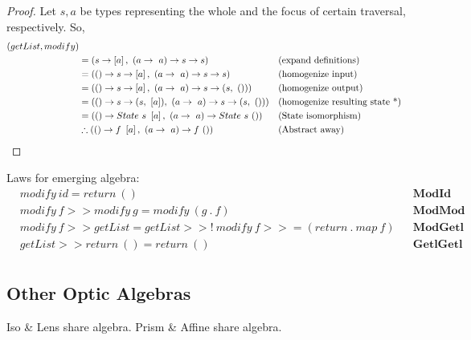 \documentclass[a4paper]{article}
\begin{document}
\begin{proof}
  Let $s, a$ be types representing the whole and the focus of certain traversal,
  respectively. So,
  \begin{align*}
    (getList, modify) \\
    &= (s \rightarrow \left[a\right],\ (a \rightarrow\ a) \rightarrow s \rightarrow s) &&\text{(expand definitions)} \\
    &= (() \rightarrow s \rightarrow \left[a\right],\ (a \rightarrow\ a) \rightarrow s \rightarrow s) &&\text{(homogenize input)} \\
    &= (() \rightarrow s \rightarrow \left[a\right],\ (a \rightarrow\ a) \rightarrow s \rightarrow (s,\ ())) &&\text{(homogenize output)} \\
    &= (() \rightarrow s \rightarrow (s,\ \left[a\right]),\ (a \rightarrow\ a) \rightarrow s \rightarrow (s,\ ())) &&\text{(homogenize resulting state *)} \\
    &= (() \rightarrow State\ s\ \left[a\right],\ (a \rightarrow\ a) \rightarrow State\ s\ ()) &&\text{(State isomorphism)} \\
    &\therefore (() \rightarrow f\ \left[a\right],\ (a \rightarrow\ a) \rightarrow f\ ()) &&\text{(Abstract away)}\qedhere
  \end{align*}
\end{proof}

Laws for emerging algebra:
\begin{align*}
  & modify\ id = return\ () &&\textbf{ModId} \\
  & modify\ f >> modify\ g = modify\ (g\ .\ f) &&\textbf{ModMod} \\
  & modify\ f >> getList = getList >>!\ modify\ f >>= (return\ .\ map\ f) &&\textbf{ModGetl} \\
  & getList >> return\ () = return\ () &&\textbf{GetlGetl} \\
\end{align*}

\subsection{Other Optic Algebras}

  Iso \& Lens share algebra. Prism \&
Affine share algebra.
\end{document}

